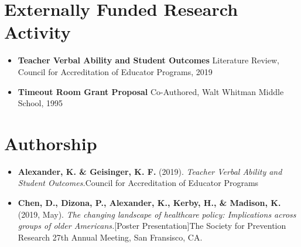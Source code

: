 \documentclass[letterpaper,11pt]{article}
\begin{document}
\section{Externally Funded Research Activity}
 \begin{itemize}[leftmargin=0.15in, label={}]
    \item
         \textbf{Teacher Verbal Ability and Student Outcomes} Literature Review, Council for Accreditation of Educator Programs, 2019 \\
     \item \textbf{Timeout Room Grant Proposal} Co-Authored, Walt Whitman Middle School, 1995 \\
 \end{itemize}

%
\section{Authorship}
 \begin{itemize}[leftmargin=0.15in, label={}]
\item
     \textbf{Alexander, K. \& Geisinger, K. F.} (2019). \emph{Teacher Verbal Ability and Student Outcomes.}{Council for Accreditation of Educator Programs} \\
     \item\textbf{Chen, D., Dizona, P., Alexander, K., Kerby, H., \& Madison, K.} (2019, May). \emph{The changing landscape of healthcare policy: Implications across groups of older Americans.}{[Poster Presentation]}{The Society for Prevention Research 27th Annual Meeting, San Fransisco, CA.} \\
  \end{itemize}

%
\end{document}
